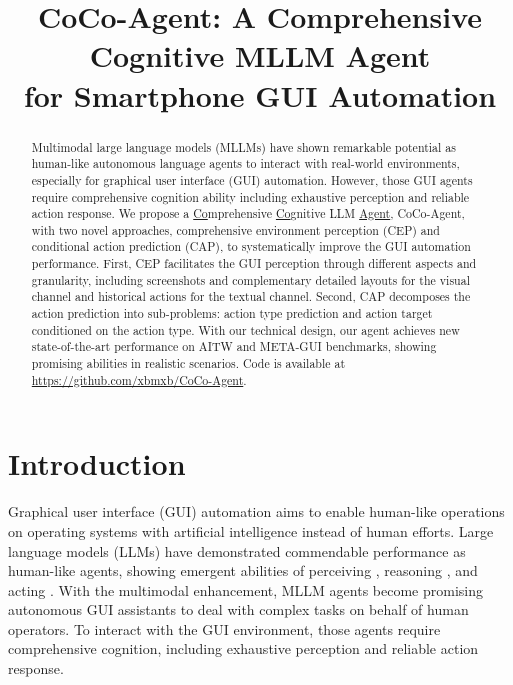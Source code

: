 \title{CoCo-Agent: A Comprehensive Cognitive MLLM Agent \\ for Smartphone GUI Automation}



\maketitle
\begin{abstract}
Multimodal large language models (MLLMs) have shown remarkable potential as human-like autonomous language agents to interact with real-world environments, especially for graphical user interface (GUI) automation.
However, those GUI agents require comprehensive cognition ability including exhaustive perception and reliable action response.
We propose a \underline{Co}mprehensive \underline{Co}gnitive LLM \underline{Agent}, CoCo-Agent, with two novel approaches, comprehensive environment perception (CEP) and conditional action prediction (CAP), to systematically improve the GUI automation performance. 
First, CEP facilitates the GUI perception through different aspects and granularity, including screenshots and complementary detailed layouts for the visual channel and historical actions for the textual channel.
Second, CAP decomposes the action prediction into sub-problems: action type prediction and action target conditioned on the action type.
With our technical design, our agent achieves new state-of-the-art performance on AITW and META-GUI benchmarks, showing promising abilities in realistic scenarios. Code is available at \url{https://github.com/xbmxb/CoCo-Agent}.

\end{abstract}

\section{Introduction}

Graphical user interface (GUI) automation aims to enable human-like operations on operating systems with artificial intelligence instead of human efforts.
Large language models (LLMs) have demonstrated commendable performance as human-like agents, showing emergent abilities of perceiving \cite{yao2023react}, reasoning \cite{li2023camel, Park2023GenerativeAgents}, and acting \cite{wang2023voyager, autogpt}.
With the multimodal enhancement, MLLM agents become promising autonomous GUI assistants to deal with complex tasks on behalf of human operators.
To interact with the GUI environment, those agents require comprehensive cognition, including exhaustive perception and reliable action response.

